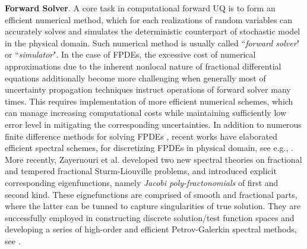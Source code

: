 \vspace{0.1 in}
%
\noindent\textbf{Forward Solver}.
%
A core task in computational forward UQ is to form an efficient numerical method, which for each realizations of random variables can accurately solves and simulates the deterministic counterpart of stochastic model in the physical domain. Such numerical method is usually called ``\textit{forward solver}" or ``\textit{simulator}". In the case of FPDEs, the excessive cost of numerical approximations due to the inherent nonlocal nature of fractional differential equations additionally become more challenging when generally most of uncertainty propagation techniques instruct operations of forward solver many times. This requires implementation of more efficient numerical schemes, which can manage increasing computational costs while maintaining sufficiently low error level in mitigating the corresponding uncertainties. In addition to numerous finite difference methods for solving FPDEs \cite{Gorenflo2002, Sun2006,  Lin2007, wang2010direct, wang2011fast, Cao2013, zeng2015numerical, zayernouri2016_JCP_Frac_AB_AM}, recent works have elaborated efficient spectral schemes, for discretizing FPDEs in physical domain, see e.g., \cite{Rawashdeh2006, Lin2007, Khader2011, Khader2012, Li2009, Li2010, chen2014generalized, wang2015high, bhrawy2015spectral}. More recently, Zayernouri et al. \cite{Zayernouri2013, zayernouri2015tempered} developed two new spectral theories on fractional and tempered fractional Sturm-Liouville problems, and introduced explicit corresponding eigenfunctions, namely \textit{Jacobi poly-fractonomials} of first and second kind. These eignefunctions are comprised of smooth and fractional parts, where the latter can be tunned to capture singularities of true solution. They are successfully employed in constructing discrete solution/test function spaces and developing a series of high-order and efficient Petrov-Galerkin spectral methods, see \cite{lischke2017petrov, suzuki2016fractional,samiee2016,samiee2017fast,samiee2017unified,samiee2018petrov,kharazmi2017petrov,kharazmi2017sem,kharazmi2018fractional}.



\vspace{0.1 in}

